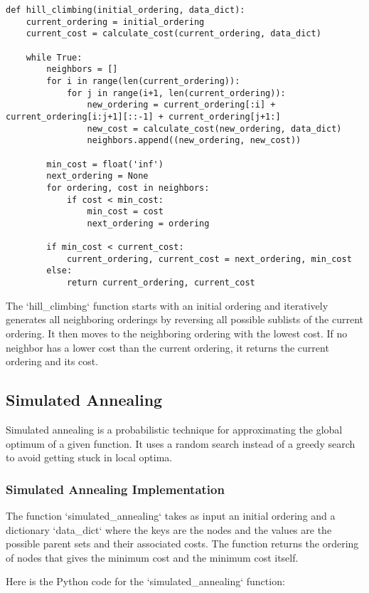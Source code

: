 \documentclass{article}
\begin{document}
\begin{verbatim}
def hill_climbing(initial_ordering, data_dict):
    current_ordering = initial_ordering
    current_cost = calculate_cost(current_ordering, data_dict)

    while True:
        neighbors = []
        for i in range(len(current_ordering)):
            for j in range(i+1, len(current_ordering)):
                new_ordering = current_ordering[:i] + current_ordering[i:j+1][::-1] + current_ordering[j+1:]
                new_cost = calculate_cost(new_ordering, data_dict)
                neighbors.append((new_ordering, new_cost))

        min_cost = float('inf')
        next_ordering = None
        for ordering, cost in neighbors:
            if cost < min_cost:
                min_cost = cost
                next_ordering = ordering

        if min_cost < current_cost:
            current_ordering, current_cost = next_ordering, min_cost
        else:
            return current_ordering, current_cost
\end{verbatim}

The `hill\_climbing` function starts with an initial ordering and iteratively generates all neighboring orderings by reversing all possible sublists of the current ordering. It then moves to the neighboring ordering with the lowest cost. If no neighbor has a lower cost than the current ordering, it returns the current ordering and its cost.
\subsection{Simulated Annealing}

Simulated annealing is a probabilistic technique for approximating the global optimum of a given function. It uses a random search instead of a greedy search to avoid getting stuck in local optima.

\subsubsection{Simulated Annealing Implementation}
The function `simulated\_annealing` takes as input an initial ordering and a dictionary `data\_dict` where the keys are the nodes and the values are the possible parent sets and their associated costs. The function returns the ordering of nodes that gives the minimum cost and the minimum cost itself.

Here is the Python code for the `simulated\_annealing` function:
\end{document}
